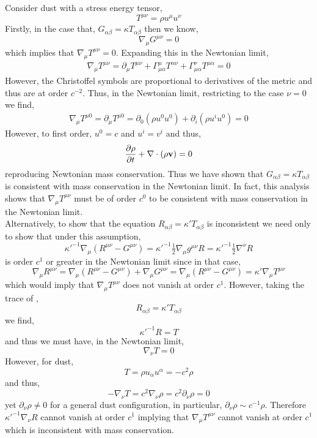 \documentclass[12pt]{article}
\begin{document}
Consider dust with a stress energy tensor,
\[ T^{\mu \nu} = \rho u^\mu u^\nu \]
Firstly, in the case that, $G_{\alpha \beta} = \kappa T_{\alpha \beta}$ then we know,
\[ \nabla_\mu G^{\mu \nu} = 0 \]
which implies that $\nabla_\mu T^{\mu \nu} = 0$. Expanding this in the Newtonian limit,
\begin{align*}
\nabla_\mu T^{\mu \nu} = \partial_\mu T^{\mu \nu} + \Gamma^\mu_{\mu \alpha} T^{\alpha \nu} + \Gamma^\nu_{\mu \alpha} T^{\mu \alpha} = 0
\end{align*}
However, the Christoffel symbols are proportional to derivatives of the metric and thus are at order $c^{-2}$. Thus, in the Newtonian limit, restricting to the case $\nu = 0$ we find,
\begin{align*}
\nabla_\mu T^{\mu 0} = \partial_\mu T^{\mu 0} = \partial_0 (\rho u^0 u^0) + \partial_i (\rho u^i u^0) = 0
\end{align*}
However, to first order, $u^0 = c$ and $u^i = v^i$ and thus,
\[ \frac{\partial{\rho}}{\partial{t}} + \nabla \cdot (\rho \mathbf{v}) = 0 \]
reproducing Newtonian mass conservation. Thus we have shown that $G_{\alpha \beta} = \kappa T_{\alpha \beta}$ is consistent with mass conservation in the Newtonian limit. In fact, this analysis shows that $\nabla_\mu T^{\mu \nu}$ must be of order $c^{0}$ to be consistent with mass conservation in the Newtonian limit. 
\bigskip\\
Alternatively, to show that the equation $R_{\alpha \beta} = \kappa' T_{\alpha \beta}$ is inconsistent we need only to show that under this assumption,
\[ \kappa'^{-1} \nabla_\mu (R^{\mu \nu} - G^{\mu \nu}) = \kappa'^{-1} \tfrac{1}{2} \nabla_\mu g^{\mu \nu} R = \kappa'^{-1} \tfrac{1}{2} \nabla^\nu R  \]
is order $c^1$ or greater in the Newtonian limit since in that case,
\[ \nabla_\mu R^{\mu \nu} = \nabla_\mu (R^{\mu \nu} - G^{\mu \nu})  + \nabla_\mu G^{\mu \nu} = \nabla_\mu (R^{\mu \nu} - G^{\mu \nu}) = \kappa' \nabla_\mu T^{\mu \nu} \]
which would imply that $\nabla_\mu T^{\mu \nu}$ does not vanish at order $c^1$. 
However, taking the trace of ,
\[ R_{\alpha \beta} = \kappa' T_{\alpha \beta} \] 
we find,
\[ \kappa'^{-1} R = T \]
and thus we must have, in the Newtonian limit,
\[  \nabla_\nu T = 0 \]
However, for dust,
\[ T = \rho u_\alpha u^\alpha = -c^2 \rho \]
and thus,
\[ - \nabla_\nu T = c^2 \nabla_\nu \rho = c^2 \partial_\nu \rho = 0 \]
yet $\partial_\nu \rho \neq 0$ for a general dust configuration, in particular, $\partial_\nu \rho \sim c^{-1} \rho$. Therefore $\kappa'^{-1} \nabla_\nu R$ cannot vanish at order $c^1$ implying that $\nabla_{\mu} T^{\mu \nu}$ cannot vanish at order $c^1$ which is inconsistent with mass conservation. 
\end{document}
